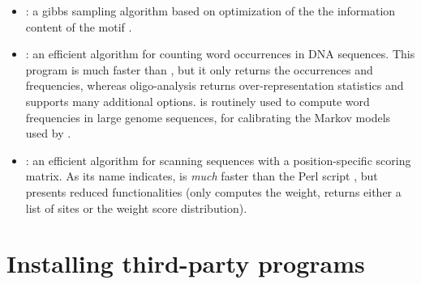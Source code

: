 \documentclass[12pt,a4paper, oneside]{scrreprt} %
\begin{document}
\begin{itemize}
\item {}: a gibbs sampling algorithm based on
  optimization of the the information content of the motif
  \cite{Defrance:2009}.

\item {}: an efficient algorithm for counting word
  occurrences in DNA sequences. This program is much faster than
  , but it only returns the occurrences and
  frequencies, whereas oligo-analysis returns over-representation
  statistics and supports many additional
  options.  is routinely used to compute word
  frequencies in large genome sequences, for calibrating the Markov
  models used by .

\item {}: an efficient algorithm for scanning
  sequences with a position-specific scoring matrix. As its name
  indicates,  is \emph{much} faster than
  the Perl script , but presents reduced
  functionalities (only computes the weight, returns either a list of
  sites or the weight score distribution).
\end{itemize}
















\chapter{Installing third-party programs}
\end{document}
